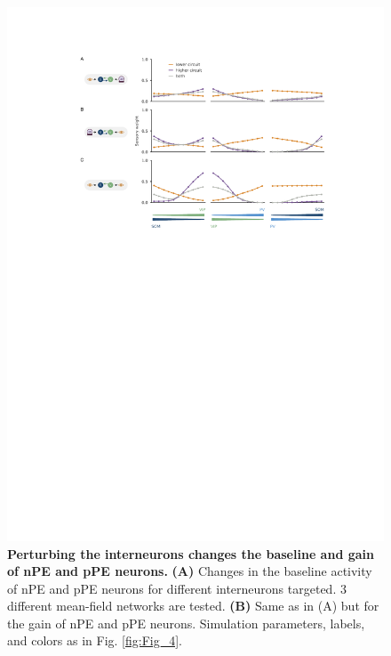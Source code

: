 \documentclass[10pt,a4paper]{article}
\begin{document}
\begin{figure}[!h]
	\centering
    \includegraphics{../results/figures/final/Fig_4_S2}%
\caption{\footnotesize{\bf Perturbing the interneurons changes the baseline and gain of nPE and pPE neurons.\newline}  
{\bf (A)} Changes in the baseline activity of nPE and pPE neurons for different interneurons targeted. 3 different mean-field networks are tested.
{\bf (B)} Same as in (A) but for the gain of nPE and pPE neurons. Simulation parameters, labels, and colors as in Fig. \ref{fig:Fig_4}. 
}
\label{fig:Fig_4_S2}
\end{figure}


\end{document}
